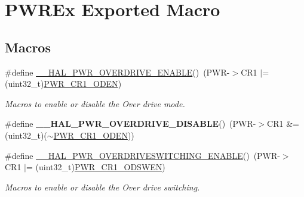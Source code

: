 \hypertarget{group___p_w_r_ex___exported___macro}{}\section{P\+W\+R\+Ex Exported Macro}
\label{group___p_w_r_ex___exported___macro}
\subsection*{Macros}
\begin{DoxyCompactItemize}
\item 
\mbox{\label{group___p_w_r_ex___exported___macro_gaa6904ae4fd3b27e546a1a9ca86fd0325}} 
\#define \mbox{\hyperlink{group___p_w_r_ex___exported___macro_gaa6904ae4fd3b27e546a1a9ca86fd0325}{\+\_\+\+\_\+\+H\+A\+L\+\_\+\+P\+W\+R\+\_\+\+O\+V\+E\+R\+D\+R\+I\+V\+E\+\_\+\+E\+N\+A\+B\+LE}}()~(P\+WR-\/$>$C\+R1 $\vert$= (uint32\+\_\+t)\mbox{\hyperlink{group___peripheral___registers___bits___definition_ga034c9289598bc36001141083890598fa}{P\+W\+R\+\_\+\+C\+R1\+\_\+\+O\+D\+EN}})
\begin{DoxyCompactList}\small\item\em Macros to enable or disable the Over drive mode. \end{DoxyCompactList}\item 
\mbox{\label{group___p_w_r_ex___exported___macro_ga1bfa0d1a811b22c638028e721a8f25fe}} 
\#define {\bfseries \+\_\+\+\_\+\+H\+A\+L\+\_\+\+P\+W\+R\+\_\+\+O\+V\+E\+R\+D\+R\+I\+V\+E\+\_\+\+D\+I\+S\+A\+B\+LE}()~(P\+WR-\/$>$C\+R1 \&= (uint32\+\_\+t)($\sim$\mbox{\hyperlink{group___peripheral___registers___bits___definition_ga034c9289598bc36001141083890598fa}{P\+W\+R\+\_\+\+C\+R1\+\_\+\+O\+D\+EN}}))
\item 
\mbox{\label{group___p_w_r_ex___exported___macro_ga1f5fd3a41a03c729b283bf05af030716}} 
\#define \mbox{\hyperlink{group___p_w_r_ex___exported___macro_ga1f5fd3a41a03c729b283bf05af030716}{\+\_\+\+\_\+\+H\+A\+L\+\_\+\+P\+W\+R\+\_\+\+O\+V\+E\+R\+D\+R\+I\+V\+E\+S\+W\+I\+T\+C\+H\+I\+N\+G\+\_\+\+E\+N\+A\+B\+LE}}()~(P\+WR-\/$>$C\+R1 $\vert$= (uint32\+\_\+t)\mbox{\hyperlink{group___peripheral___registers___bits___definition_ga570acaf0a109bf1678acb3eebd7aa84b}{P\+W\+R\+\_\+\+C\+R1\+\_\+\+O\+D\+S\+W\+EN}})
\begin{DoxyCompactList}\small\item\em Macros to enable or disable the Over drive switching. \end{DoxyCompactList}\item 

\end{DoxyCompactItemize}
